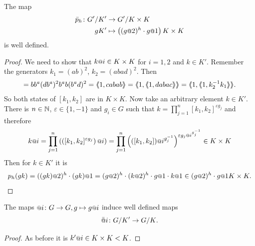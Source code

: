 \documentclass[a4paper,11pt]{amsart}
\begin{document}
\begin{lem} \label{lem:pIsDefinedModK'}
 The map 
 \begin{align*} 
  \bar p_h\colon \RNK{G'}{K'} &\to \RNK{G'}{K\times K}\\
  gK'&\mapsto \left((g\at{2})^h\cdot g\at{1}\right){K\times K}
 \end{align*}
is well defined.
\end{lem}
\begin{proof}
We need to show that $k\at{i} \in K\times K$ for $i=1,2$ and $k\in K'$. Remember the generators $k_1=(ab)^2$, $k_2=(abad)^2$. Then 
\begin{align*}
 [k_1,k_2]=bb^a(db^a)^2b^ab(b^ad)^2 = \pair{1,cabab}=\pair{1,\pair{1,dabac}}=\pair{1,\pair{1,k_2^{-1}k_1}}.
\end{align*}
So both states of $[k_1,k_2]$ are in $K\times K$. Now take an arbitrary element $k\in K'$.
There is $n\in\mathbb{N}$, $\varepsilon \in \{1,-1\}$ and $g_i\in G$ such that 
$k=\prod_{j=1}^n [k_1,k_2]^{\varepsilon g_j}$
and therefore 
\[k\at{i}=\prod_{j=1}^n\left( \left([k_1,k_2]^{\varepsilon g_j}\right)\at{i}\right)
	 = \prod_{j=1}^n \left(([k_1,k_2])\at{i^{g_j^{-1}}}\right)^{\varepsilon g_j\at{i^{g_j^{-1}}}}\in K\times K\]
 Then for $k\in K'$ it is 
 \[p_h(gk) = ((gk)\at{2})^h\cdot (gk)\at{1} = (g\at{2})^h\cdot (k\at{2})^h\cdot g\at{1}\cdot k\at{1}\in (g\at{2})^h\cdot g\at{1}K\times K.\]
\end{proof}
\begin{lem} \label{lem:atIsWellDefinedModK'}
 The maps $\at{i}\colon G\to G, g\mapsto g\at{i}$ induce well defined maps \[\att{i}\colon \RNK{G}{K'}\to\RNK{G}{K}.\]
\end{lem}
\begin{proof}
 As before it is $k'\at{i} \in K\times K < K$.
%  
%  
% 
\end{proof}
\end{document}
